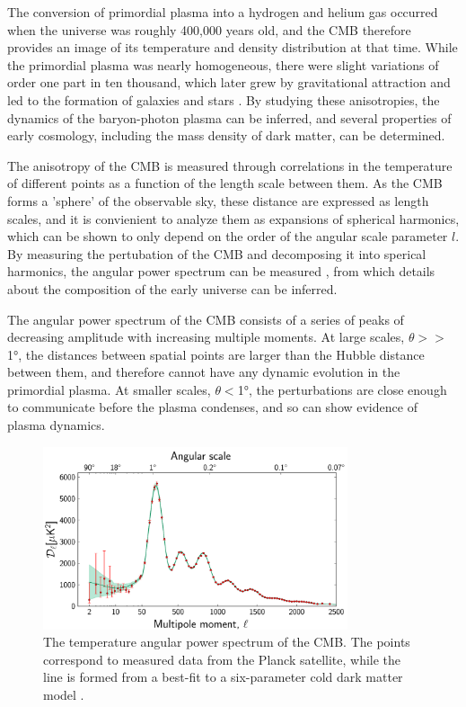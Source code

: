 The conversion of primordial plasma into a hydrogen and helium gas occurred when the universe was roughly 400,000 years old, and the CMB therefore provides an image of its temperature and density distribution at that time.
While the primordial plasma was nearly homogeneous, there were slight variations of order one part in ten thousand, which later grew by gravitational attraction and led to the formation of galaxies and stars \cite{kurkisuonio}.
By studying these anisotropies, the dynamics of the baryon-photon plasma can be inferred, and several properties of early cosmology, including the mass density of dark matter, can be determined.

The anisotropy of the CMB is measured through correlations in the temperature of different points as a function of the length scale between them. 
As the CMB forms a 'sphere' of the observable sky, these distance are expressed as length scales, and it is convienient to analyze them as expansions of spherical harmonics, which can be shown to only depend on the order of the angular scale parameter $l$. 
By measuring the pertubation of the CMB and decomposing it into sperical harmonics, the angular power spectrum can be measured , from which details about the composition of the early universe can be inferred.

The angular power spectrum of the CMB consists of a series of peaks of decreasing amplitude with increasing multiple moments. 
At large scales, $\theta >> $\ang{1}, the distances between spatial points are larger than the Hubble distance between them, and therefore cannot have any dynamic evolution in the primordial plasma.
At smaller scales, $\theta < $\ang{1}, the perturbations are close enough to communicate before the plasma condenses, and so can show evidence of plasma dynamics.

\begin{figure}[htpb]
	\label{fig:CMBpowerSpectrum}
	\centering
	\includegraphics[width=0.8\textwidth]{figures/cmb_power_spectrum.png}
	\caption[The temperature angular power spectrum of the CMB]{The temperature angular power spectrum of the CMB. The points correspond to measured data from the Planck satellite, while the line is formed from a best-fit to a six-parameter cold dark matter model \cite{PlanckCMB}.}
\end{figure}

